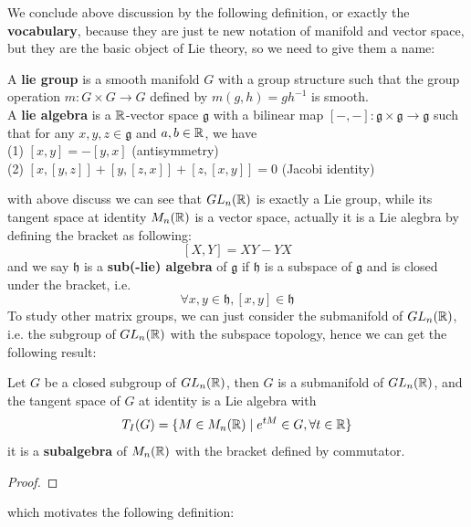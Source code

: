We conclude above discussion by the following definition, or exactly the \textbf{vocabulary}, because they are just te new notation of manifold and vector space, but they are the basic object of Lie theory, so we need to give them a name:
\begin{definition} 
    A \textbf{lie group} is a smooth manifold \(G\) with a group structure such that the group operation \(m: G \times G \to G\) defined by \(m(g,h) = gh^{-1}\) is smooth.\\

    A \textbf{lie algebra} is a \(\mathbb{R}\)-vector space \(\mathfrak{g}\) with a bilinear map \([-, -]: \mathfrak{g} \times \mathfrak{g} \to \mathfrak{g}\) such that for any \(x,y,z \in \mathfrak{g}\) and \(a,b \in \mathbb{R}\), we have\\

    (1) \([x,y] = -[y,x]\) (antisymmetry)\\

    (2) \([x,[y,z]] + [y,[z,x]] + [z,[x,y]] = 0\) (Jacobi identity)
\end{definition}

with above discuss we can see that \(GL_n(\mathbb{R})\) is exactly a Lie group, while its tangent space at identity \(M_n(\mathbb{R})\) is a vector space, actually it is a Lie alegbra by defining the bracket as following:
\[[X,Y] = XY - YX\]
and we say \(\mathfrak{h}\) is a \textbf{sub(-lie) algebra} of \(\mathfrak{g}\) if \(\mathfrak{h}\) is a subspace of \(\mathfrak{g}\) and is closed under the bracket, i.e.
 \[\forall x,y \in \mathfrak{h}, [x,y] \in \mathfrak{h}\]
To study other matrix groups, we can just consider the submanifold of \(GL_n(\mathbb{R})\), i.e. the subgroup of \(GL_n(\mathbb{R})\) with the subspace topology, hence we can get the following result:

\begin{colortheorem} \label{linearliegroup}
    Let \(G\) be a closed subgroup of \(GL_n(\mathbb{R})\), then \(G\) is a submanifold of \(GL_n(\mathbb{R})\), and the tangent space of \(G\) at identity is a Lie algebra with
    \[T_I(G) = \{M \in M_n(\mathbb{R}) \mid e^{tM} \in G, \forall t \in \mathbb{R}\}\]
    it is a \textbf{subalgebra} of \(M_n(\mathbb{R})\) with the bracket defined by commutator.
\end{colortheorem}

\begin{proof}
    
\end{proof}

which motivates the following definition:

